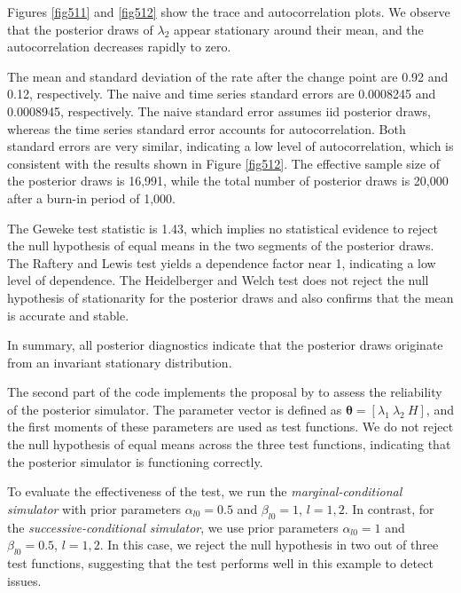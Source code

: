 Figures \ref{fig511} and \ref{fig512} show the trace and autocorrelation plots. We observe that the posterior draws of $\lambda_2$ appear stationary around their mean, and the autocorrelation decreases rapidly to zero.

The mean and standard deviation of the rate after the change point are 0.92 and 0.12, respectively. The naive and time series standard errors are 0.0008245 and 0.0008945, respectively. The naive standard error assumes iid posterior draws, whereas the time series standard error accounts for autocorrelation. Both standard errors are very similar, indicating a low level of autocorrelation, which is consistent with the results shown in Figure \ref{fig512}. The effective sample size of the posterior draws is 16,991, while the total number of posterior draws is 20,000 after a burn-in period of 1,000.

The Geweke test statistic is 1.43, which implies no statistical evidence to reject the null hypothesis of equal means in the two segments of the posterior draws. The Raftery and Lewis test yields a dependence factor near 1, indicating a low level of dependence. The Heidelberger and Welch test does not reject the null hypothesis of stationarity for the posterior draws and also confirms that the mean is accurate and stable.

In summary, all posterior diagnostics indicate that the posterior draws originate from an invariant stationary distribution.

The second part of the code implements the proposal by \cite{geweke2004getting} to assess the reliability of the posterior simulator. The parameter vector is defined as $\bm{\theta} = [\lambda_1 \ \lambda_2 \ H]$, and the first moments of these parameters are used as test functions. We do not reject the null hypothesis of equal means across the three test functions, indicating that the posterior simulator is functioning correctly.

To evaluate the effectiveness of the test, we run the \textit{marginal-conditional simulator} with prior parameters $\alpha_{l0} = 0.5$ and $\beta_{l0} = 1$, $l = 1, 2$. In contrast, for the \textit{successive-conditional simulator}, we use prior parameters $\alpha_{l0} = 1$ and $\beta_{l0} = 0.5$, $l = 1, 2$. In this case, we reject the null hypothesis in two out of three test functions, suggesting that the test performs well in this example to detect issues.

